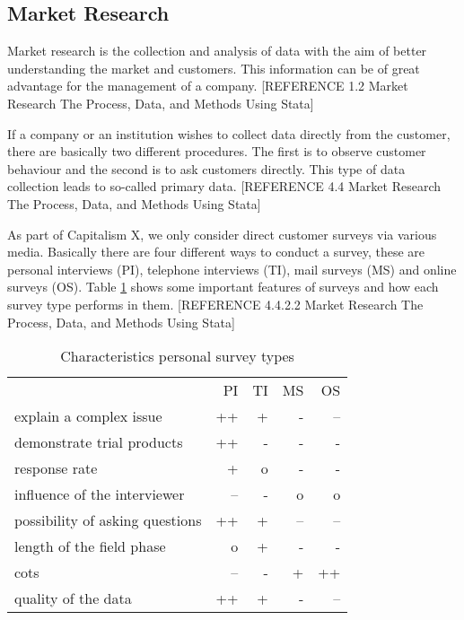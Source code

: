 \subsection{Market Research}
Market research is the collection and analysis of data with the aim of better understanding the market and customers. This information can be of great advantage for the management of a company. [REFERENCE 1.2 Market Research The Process, Data, and Methods Using Stata]

If a company or an institution wishes to collect data directly from the customer, there are basically two different procedures. The first is to observe customer behaviour and the second is to ask customers directly. This type of data collection leads to so-called primary data. [REFERENCE 4.4 Market Research The Process, Data, and Methods Using Stata]

As part of Capitalism X, we only consider direct customer surveys via various media. Basically there are four different ways to conduct a survey, these are personal interviews (PI), telephone interviews (TI), mail surveys (MS) and online surveys (OS). Table \ref{MR_survey_types_characteristics} shows some important features of surveys and how each survey type performs in them. [REFERENCE 4.4.2.2 Market Research The Process, Data, and Methods Using Stata] 

\begin{table}[ht]
\centering
\begin{tabular}{|l|r|r|r|r|}
\hline
        & PI & TI  & MS & OS \\
explain a complex issue         & ++    & +     & -    & --  \\
demonstrate trial products      & ++    & -     & -    & -   \\
response rate                   & +     & o     & -    & -   \\
influence of the interviewer    & --    & -     & o    & o   \\
possibility of asking questions & ++    & +     & --   & --  \\
length of the field phase       & o     & +     & -    & -   \\
cots                            & --    & -     & +    & ++  \\
quality of the data             & ++    & +     & -    & --  \\
\hline
\end{tabular}
\caption{Characteristics personal survey types}
\label{MR_survey_types_characteristics}
\end{table}

